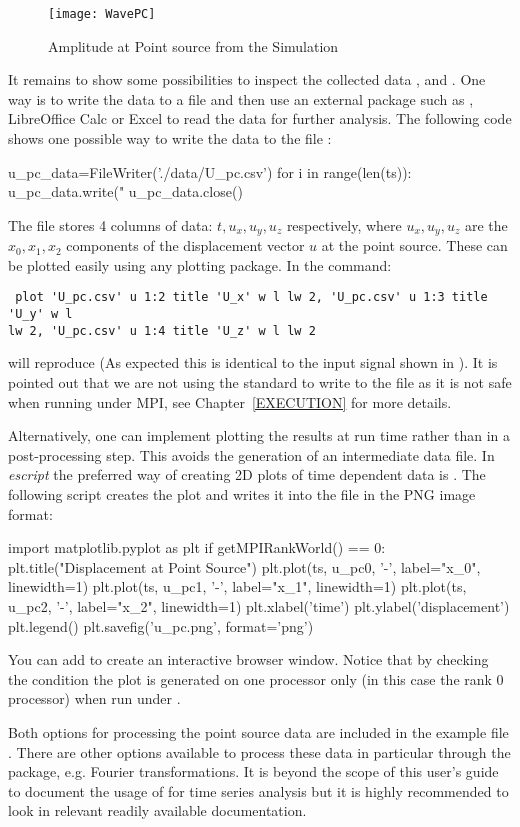 \begin{figure}[t!]
\centerline{\texttt{[image: WavePC]}}
\caption{Amplitude at Point source from the Simulation}
\label{WAVE FIG 1}
\end{figure}

It remains to show some possibilities to inspect the collected data
,  and .
One way is to write the data to a file and then use an external package such
as \gnuplot, LibreOffice Calc or Excel to read the data for further analysis.
The following code shows one possible way to write the data to the file :
\begin{python}
  u_pc_data=FileWriter('./data/U_pc.csv')
  for i in range(len(ts)):
      u_pc_data.write("%
  u_pc_data.close()
\end{python}
The file  stores 4 columns of data: $t,u_x,u_y,u_z$
respectively, where $u_x,u_y,u_z$ are the
$x_0,x_1,x_2$ components of the displacement
vector $u$ at the point source.
These can be plotted easily using any plotting package.
In \gnuplot the command:
\begin{verbatim}
 plot 'U_pc.csv' u 1:2 title 'U_x' w l lw 2, 'U_pc.csv' u 1:3 title 'U_y' w l
lw 2, 'U_pc.csv' u 1:4 title 'U_z' w l lw 2
\end{verbatim}
will reproduce  (As expected this is identical to the input
signal shown in ).
It is pointed out that we are not using the standard \PYTHON {}
to write to the file  as it is not safe when running \escript
under MPI, see Chapter~\ref{EXECUTION} for more details.

Alternatively, one can implement plotting the results at run time rather than
in a post-processing step.
This avoids the generation of an intermediate data file.
In {\it escript} the preferred way of creating 2D plots of time dependent data
is \MATPLOTLIB. The following script creates the plot and writes it into the
file  in the PNG image format:
\begin{python}
  import matplotlib.pyplot as plt
  if getMPIRankWorld() == 0:
      plt.title("Displacement at Point Source")
      plt.plot(ts, u_pc0, '-', label="x_0", linewidth=1)
      plt.plot(ts, u_pc1, '-', label="x_1", linewidth=1)
      plt.plot(ts, u_pc2, '-', label="x_2", linewidth=1)
      plt.xlabel('time')
      plt.ylabel('displacement')
      plt.legend()
      plt.savefig('u_pc.png', format='png')
\end{python}
You can add  to create an interactive browser window.
Notice that by checking the condition  the plot
is generated on one processor only (in this case the rank 0 processor) when
run under \MPI. 

Both options for processing the point source data are included in the example
file . There are other options available to process these data
in particular through the \SCIPY package, e.g. Fourier transformations.
It is beyond the scope of this user's guide to document the usage of
\SCIPY for time series analysis but it is highly recommended to look in
relevant readily available documentation.

